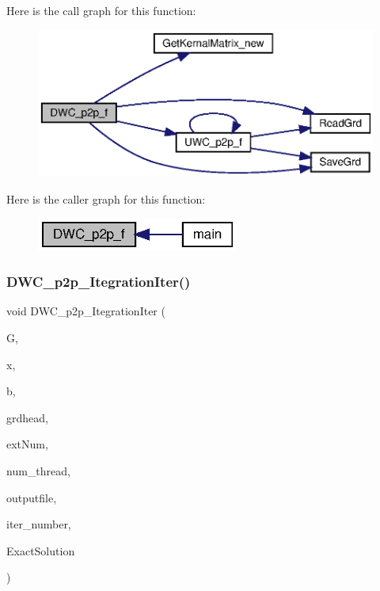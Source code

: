 Here is the call graph for this function\+:
\nopagebreak
\begin{figure}[H]
\begin{center}
\leavevmode
\includegraphics[width=350pt]{Conti2D_8cpp_afb187c363388d28caa8a055176269f12_afb187c363388d28caa8a055176269f12_cgraph}
\end{center}
\end{figure}
Here is the caller graph for this function\+:\nopagebreak
\begin{figure}[H]
\begin{center}
\leavevmode
\includegraphics[width=188pt]{Conti2D_8cpp_afb187c363388d28caa8a055176269f12_afb187c363388d28caa8a055176269f12_icgraph}
\end{center}
\end{figure}
\mbox{\label{Conti2D_8cpp_ad9d4ab56b3ff557565d82cf01ab598ad_ad9d4ab56b3ff557565d82cf01ab598ad}} 
\subsubsection{D\+W\+C\+\_\+p2p\+\_\+\+Itegration\+Iter()}
{\footnotesize\ttfamily void D\+W\+C\+\_\+p2p\+\_\+\+Itegration\+Iter (\begin{DoxyParamCaption}\item[{double $\ast$}]{G,  }\item[{double $\ast$}]{x,  }\item[{double $\ast$}]{b,  }\item[{\textbf{ Grd\+Head}}]{grdhead,  }\item[{int}]{ext\+Num,  }\item[{int}]{num\+\_\+thread,  }\item[{string}]{outputfile,  }\item[{double}]{iter\+\_\+number,  }\item[{double $\ast$}]{Exact\+Solution }\end{DoxyParamCaption})}




